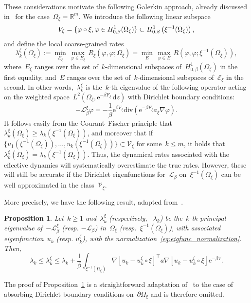 \documentclass[a4]{article}
\newcommand{\cL}{\mathcal{L}}
\renewcommand{\d}{\mathrm{d}}
\newcommand{\e}{\mathrm{e}}
\renewcommand{\div}{\mathrm{div}}
\newcommand{\R}{\mathbb{R}}
\newcommand{\1}{\mathbbm 1}
\newtheorem{proposition}{Proposition}
\begin{document}
    These considerations motivate the following Galerkin approach, already discussed in~\cite[Section 3.3.2]{ZHS16} for the case~$\Omega_\xi=\R^m$.
    We introduce the following linear subspace
    \begin{equation}
        \mathcal \mathcal V_\xi = \{\varphi\circ \xi,\varphi\in H_{0,\beta}^1(\Omega_\xi)\} \subset H_{0,\beta}^1\left(\xi^{-1}(\Omega_\xi)\right),
    \end{equation}
    and define the local coarse-grained rates
    \begin{equation}
        \label{eq:variational_principle_xi}
        \lambda^\xi_k(\Omega_\xi) := \underset{E_\xi}{\min}\,\underset{\varphi\in E_\xi}{\max}\,R_\xi(\varphi,\varphi;\Omega_\xi) = \underset{E}{\min}\,\underset{\varphi\in E}{\max}\,R\left(\varphi,\varphi;\xi^{-1}(\Omega_\xi)\right),
    \end{equation}
    where~$E_\xi$ ranges over the set of~$k$-dimensional subspaces of~$H_{0,\beta}^1(\Omega_\xi)$ in the first equality, and~$E$ ranges over the set of~$k$-dimensional subspaces of~$\mathcal E_\xi$ in the second.
    In other words,~$\lambda^\xi_k$ is the~$k$-th eigenvalue of the following operator acting on the weighted space~$L^2(\Omega_\xi,\e^{-\beta F_\xi}\,\d z)$ with Dirichlet boundary conditions:
    \[-\cL^\xi_\beta\varphi = -\frac{1}{\beta}\e^{\beta F_\xi}\div\left(\e^{-\beta F_\xi}a_\xi\nabla\varphi\right).\]
    It follows easily from the Courant--Fischer principle that~$\lambda^\xi_k(\Omega_\xi)\geq \lambda_k(\xi^{-1}(\Omega_\xi))$, and moreover that if~$\{u_1(\xi^{-1}(\Omega_\xi)),\dots,u_k(\xi^{-1}(\Omega_\xi))\}\subset \mathcal V_\xi$ for some~$k\leq m$, it holds that~$\lambda_k^\xi(\Omega_\xi) = \lambda_k(\xi^{-1}(\Omega_\xi))$.
    Thus, the dynamical rates associated with the effective dynamics will systematically overestimate the true rates. However, these will still be accurate if the Dirichlet eigenfunctions for~$\cL_\beta$ on~$\xi^{-1}(\Omega_\xi)$ can be well approximated in the class~$\mathcal V_\xi$.

    More precisely, we have the following result, adapted from~\cite[Proposition 5]{ZHS16}.
    \begin{proposition}
        \label{prop:rates_estimates}
        Let~$k\geq 1$ and~$\lambda^\xi_k$ (respectively, ~$\lambda_k$) be the~$k$-th principal eigenvalue of~$-\cL^\xi_\beta$ (resp. $-\cL_\beta$) in~$\Omega_\xi$ (resp.~$\xi^{-1}(\Omega_\xi)$), with associated eigenfunction~$u_k$ (resp. $u_k^\xi$), with the normalization~\eqref{eq:eigfunc_normalization}.
        Then,
        \begin{equation}
            \label{eq:rates_inequalities}
            \lambda_k \leq \lambda^\xi_k \leq \lambda_k + \frac1\beta\int_{\xi^{-1}(\Omega_\xi)}\nabla\left[u_k-u_k^\xi\circ\xi\right]^\top a\nabla\left[u_k-u_k^\xi\circ\xi\right]\e^{-\beta V}.
        \end{equation}
    \end{proposition}
    The proof of Proposition~\ref{prop:rates_estimates} is a straightforward adaptation of~\cite[Proposition 5]{ZHS16} to the case of absorbing Dirichlet boundary conditions on~$\partial\Omega_\xi$ and is therefore omitted.
\end{document}

